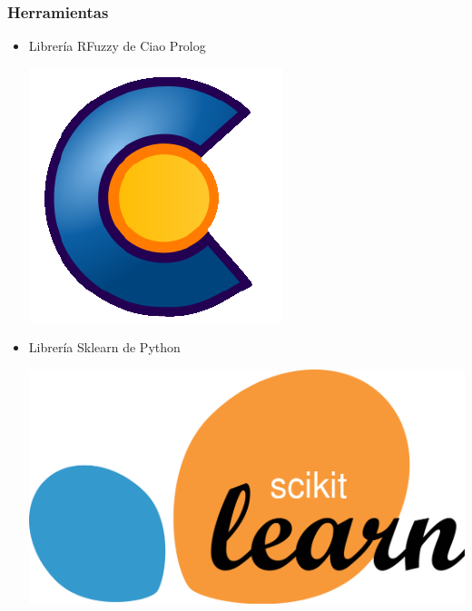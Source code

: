 \documentclass{beamer}
\newcommand{\slideauthor}[1]{\gdef\insertslideauthor{#1}}
\newcommand{\insertslideauthor}{}
\begin{document}
\begin{frame}
\frametitle{Herramientas}
\slideauthor{Diego Fogued}
\begin{itemize}
    \item \begin{minipage}[t]{0.8\linewidth}Librería RFuzzy de Ciao Prolog\end{minipage}\begin{minipage}[t]{0.1\linewidth}\includegraphics[width=\linewidth]{Images/ciao.png}\end{minipage}
    \vspace{0.25cm}
    \item \begin{minipage}[t]{0.8\linewidth}Librería Sklearn de Python\end{minipage}\begin{minipage}[t]{0.15\linewidth}\includegraphics[width=\linewidth]{Images/Sklearn.jpg}\end{minipage}

\end{itemize}
\end{frame}
\end{document}
